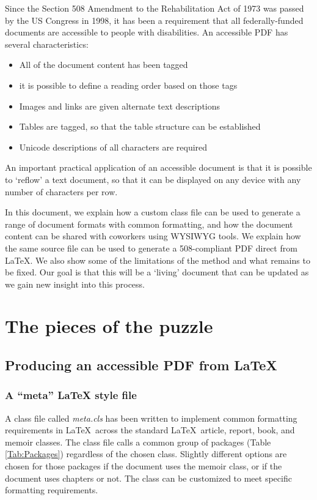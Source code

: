 \documentclass[12pt,letterpaper]{article}
\newcommand{\fn}[1]{\emph{#1}}
\begin{document}
Since the Section 508 Amendment to the Rehabilitation Act of 1973 was passed by the US Congress in 1998, it has been a requirement that all federally-funded documents are accessible to people with disabilities. An accessible PDF has several characteristics:

\begin{itemize}
\item All of the document content has been tagged
\item it is possible to define a reading order based on those tags
\item Images and links are given alternate text descriptions
\item Tables are tagged, so that the table structure can be established
\item Unicode descriptions of all characters are required
\end{itemize}

An important practical application of an accessible document is that it is possible to `reflow' a text document, so that it can be displayed on any device with any number of characters per row.

In this document, we explain how a custom class file can be used to generate a range of document formats with common formatting, and how the document content can be shared with coworkers using WYSIWYG tools. We explain how the same source file can be used to generate a 508-compliant PDF direct from \LaTeX. We also show some of the limitations of the method and what remains to be fixed. Our goal is that this will be a `living' document that can be updated as we gain new insight into this process.

\section{The pieces of the puzzle}

\subsection{Producing an accessible PDF from LaTeX}

\subsubsection{A ``meta'' LaTeX style file}\label{sec:meta.cls}
A class file called \fn{meta.cls} has been written to implement common formatting requirements in \LaTeX\ across the standard \LaTeX\ article, report, book, and memoir classes. The class file calls a common group of packages (Table \ref{Tab:Packages}) regardless of the chosen class. Slightly different options are chosen for those packages if the document uses the memoir class, or if the document uses chapters or not. The class can be customized to meet specific formatting requirements. 
\end{document}
